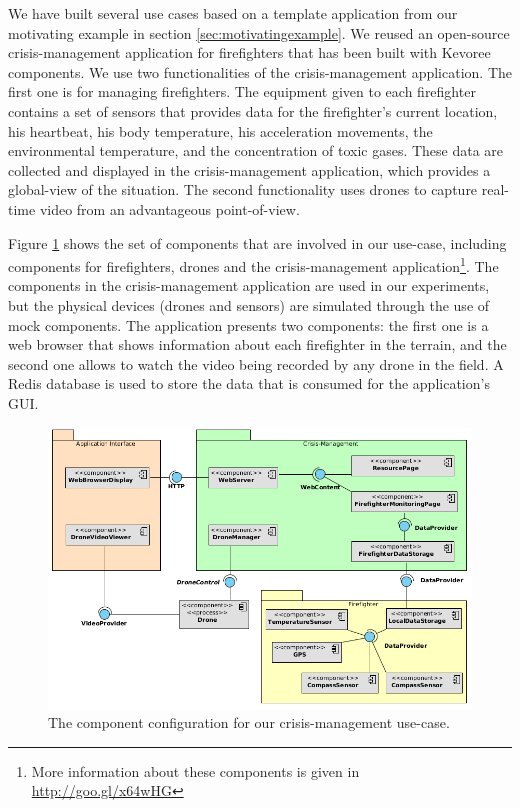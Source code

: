 We have built several use cases based on a template application from our motivating example in section \ref{sec:motivatingexample}.
We reused an open-source crisis-management application for firefighters that has been built with Kevoree components.
We use two functionalities of the crisis-management application.
The first one is for managing firefighters.
The equipment given to each firefighter contains a set of sensors that provides data for the firefighter's current location, his heartbeat, his body temperature, his acceleration movements, the environmental temperature, and the concentration of toxic gases. 
These data are collected and displayed in the crisis-management application, which provides a global-view of the situation. 
The second functionality uses drones to capture real-time video from an advantageous point-of-view.

Figure \ref{fig:complete-usecase} shows the set of components that are involved in our use-case, including components for firefighters, drones and the crisis-management application\footnote{More information about these components is given in \url{http://goo.gl/x64wHG}}. The components in the crisis-management application are used in our experiments, but the physical devices (drones and sensors) are simulated through the use of mock components.
The application presents two components: the first one is a web browser that shows information about each firefighter in the terrain, and the second one allows to watch the video being recorded by any drone in the field.
A Redis database is used to store the data that is consumed for the application's GUI.

\begin{figure}[!bt]
	\centering
	\includegraphics[scale=0.4]{./chapter5/figures/complete-usecase-new2}
	\caption{\label{fig:complete-usecase}The component configuration for our crisis-management use-case.}
\end{figure}

